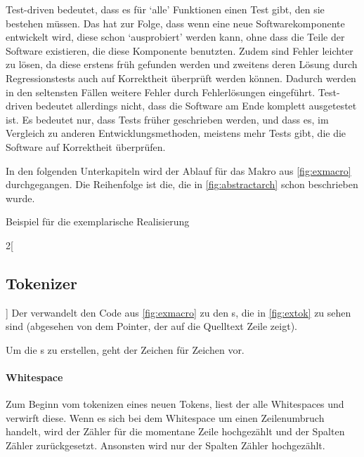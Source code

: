 {  Test-driven bedeutet, dass es für `alle' Funktionen einen Test gibt, den sie bestehen müssen. Das hat zur Folge, dass wenn eine neue Softwarekomponente entwickelt wird, diese schon `ausprobiert' werden kann, ohne dass die Teile der Software existieren, die diese Komponente benutzten. Zudem sind Fehler leichter zu lösen, da diese erstens früh gefunden werden und zweitens deren Lösung durch Regressionstests auch auf Korrektheit überprüft werden können. Dadurch werden in den seltensten Fällen weitere Fehler durch Fehlerlösungen eingeführt. Test-driven bedeutet allerdings nicht, dass die Software am Ende komplett ausgetestet ist. Es bedeutet nur, dass Tests früher geschrieben werden, und dass es, im Vergleich zu anderen Entwicklungsmethoden, meistens mehr Tests gibt, die die Software auf Korrektheit überprüfen.

  In den folgenden Unterkapiteln wird der Ablauf für das Makro aus \autoref{fig:exmacro} durchgegangen. Die Reihenfolge ist die, die in \autoref{fig:abstractarch} schon beschrieben wurde.
  \begin{myCodeEnv}
    \centering
    \begin{myInvBox}[width=.9\linewidth]
      
    \end{myInvBox}
    \caption{Beispiel für die exemplarische Realisierung}
    \label{fig:exmacro}
  \end{myCodeEnv}

  \begin{paracol}{2}[\subsection{Tokenizer}]
    \label{ssec:Tokenizer}
      Der  verwandelt den Code aus \autoref{fig:exmacro} zu den s, die in \autoref{fig:extok} zu sehen sind (abgesehen von dem Pointer, der auf die Quelltext Zeile zeigt).

      Um die s zu erstellen, geht der  Zeichen für Zeichen vor.

      \paragraph{Whitespace}
        Zum Beginn vom tokenizen eines neuen Tokens, liest der  alle Whitespaces und verwirft diese. Wenn es sich bei dem Whitespace um einen Zeilenumbruch handelt, wird der Zähler für die momentane Zeile hochgezählt und der Spalten Zähler zurückgesetzt. Ansonsten wird nur der Spalten Zähler hochgezählt.


\end{paracol}}
